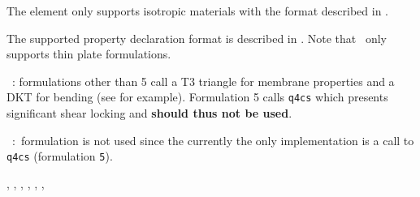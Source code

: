 The element only supports isotropic materials with the format described in \melastic.

\noindent The supported property declaration format is described in \pshell. Note that \triaa\ only supports thin plate formulations.

\vs\noindent  \triaa\ : \pshell formulations other than 5 call a T3 triangle for membrane properties and a DKT for bending (see  for example). Formulation 5 calls {\tt q4cs} which presents significant shear locking and {\bf should thus not be used}. 

\vs\triac\ :\pshell\ formulation is not used since the currently the only implementation is a call to {\tt q4cs} (formulation {\tt 5}). 


\noindent  \quada, \quadb, \femat, \pshell, \melastic, \femk, \feplot





